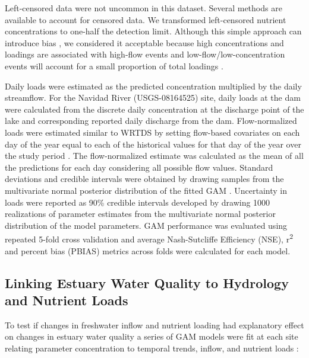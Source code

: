 \documentclass[water,article,submit,oneauthor]{Definitions/mdpi}
\begin{document}
Left-censored data were not uncommon in this dataset. Several methods
are available to account for censored data. We transformed left-censored
nutrient concentrations to one-half the detection limit. Although this
simple approach can introduce bias
\citep{hornungEstimationAverageConcentration1990}, we considered it
acceptable because high concentrations and loadings are associated with
high-flow events and low-flow/low-concentration events will account for
a small proportion of total loadings \citep{mcdowell_implications_2021}.

Daily loads were estimated as the predicted concentration multiplied by
the daily streamflow. For the Navidad River (USGS-08164525) site, daily
loads at the dam were calculated from the discrete daily concentration
at the discharge point of the lake and corresponding reported daily
discharge from the dam. Flow-normalized loads were estimated similar to
WRTDS by setting flow-based covariates on each day of the year equal to
each of the historical values for that day of the year over the study
period \citep{hirsch_weighted_2010}. The flow-normalized estimate was
calculated as the mean of all the predictions for each day considering
all possible flow values. Standard deviations and credible intervals
were obtained by drawing samples from the multivariate normal posterior
distribution of the fitted GAM
\citep{woodConfidenceIntervalsGeneralized2006, marraCoveragePropertiesConfidence2012, mcdowell_implications_2021}.
Uncertainty in loads were reported as 90\% credible intervals developed
by drawing 1000 realizations of parameter estimates from the
multivariate normal posterior distribution of the model parameters. GAM
performance was evaluated using repeated 5-fold cross validation
\citep{burmanComparativeStudyOrdinary1989} and average Nash-Sutcliffe
Efficiency (NSE), r\textsuperscript{2} and percent bias (PBIAS) metrics
across folds were calculated for each model.

\hypertarget{linking-estuary-water-quality-to-hydrology-and-nutrient-loads}{%
\subsection{Linking Estuary Water Quality to Hydrology and Nutrient
Loads}\label{linking-estuary-water-quality-to-hydrology-and-nutrient-loads}}

To test if changes in freshwater inflow and nutrient loading had
explanatory effect on changes in estuary water quality a series of GAM
models were fit at each site relating parameter concentration to
temporal trends, inflow, and nutrient loads
\citep{murphyNutrientImprovementsChesapeake2022}:
\end{document}
